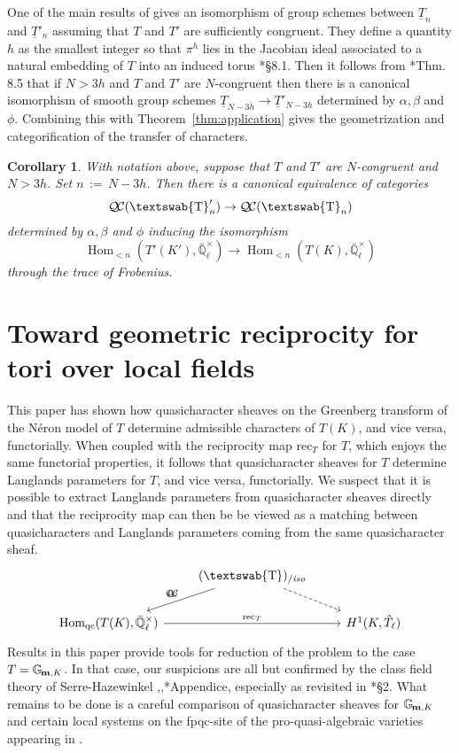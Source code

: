 \documentclass[11pt]{amsart}
\DeclareRobustCommand{\VAN}[3]{#2}
\newcommand{\mathswab}[1]{\operatorname{\textswab{#1}}}
\theoremstyle{plain}
\newtheorem{corollary}[theorem]{Corollary}
\theoremstyle{definition}
\theoremstyle{remark}
\newcommand{\EE}{\mathbb{\bar Q}_\ell}
\newcommand{\EEx}{\EE^\times}
\DeclareMathOperator{\Hom}{Hom}
\newcommand{\ceq}{{\, :=\, }}
\newcommand{\Gm}[1]{\mathbb{G}_{\hskip-1pt\textbf{m},#1}}
\newcommand{\GN}[1]{\mathswab{#1}}
\newcommand{\TT}{\underline{T}}
\newcommand{\QC}{{\mathcal{Q\hskip-0.8pt C}}}
\newcommand{\QCiso}[1]{\QC(#1)_{/\textit{iso}}}
\newcommand{\trFrob}[1]{t_{#1}}
\begin{document}
One of the main results of \cite{chai-yu:01a} gives an isomorphism of group schemes between
$\TT_n$ and $\TT'_n$ assuming that $T$ and $T'$ are sufficiently congruent.
They define a quantity $h$ as the smallest integer so that $\pi^h$ lies in the
Jacobian ideal associated to a natural embedding of $T$ into an induced torus \cite{chai-yu:01a}*{\S 8.1}.
Then it follows from \cite{chai-yu:01a}*{Thm. 8.5} that if $N > 3h$ and $T$ and $T'$ are $N$-congruent 
then there is a canonical isomorphism of smooth group schemes
 $
  \TT_{N-3h} \to \TT'_{N-3h}
 $
 determined by $\alpha, \beta$ and $\phi$.
Combining this with Theorem~\ref{thm:application} gives the geometrization and categorification of the transfer of characters.

\begin{corollary}\label{cor:transfer}
 With notation above, suppose that $T$ and $T'$ are $N$-congruent and $N > 3h$.  Set $n \ceq N-3h$.
 Then there is a canonical equivalence of categories
 \[
  \QC(\GN{T}'_{n}) \to \QC(\GN{T}_{n})
 \]
 determined by $\alpha, \beta$ and $\phi$ inducing the isomorphism
 \[
  \Hom_{<n}(T'(K'), \EEx) \to \Hom_{<n}(T(K), \EEx)
 \]
 through the trace of Frobenius.
\end{corollary}


\section{Toward geometric reciprocity for tori over local fields}
\label{sec:reciprocity}

This paper has shown how quasicharacter sheaves 
on the Greenberg transform of the Néron model of $T$ 
determine admissible characters of $T(K)$, and vice versa, functorially.
When coupled with the reciprocity map $\text{rec}_T $ for $T$, 
which enjoys the same functorial properties, 
it follows that quasicharacter sheaves for $T$ 
determine Langlands parameters for $T$, and vice versa, functorially.
We suspect that it is possible to extract Langlands parameters 
from quasicharacter sheaves directly and that the reciprocity map 
can then be be viewed as a matching between quasicharacters and Langlands parameters coming
 from the same quasicharacter sheaf. 
 \[
\begin{tikzcd}
\ & \arrow[swap]{dl}{\trFrob{G}} \QCiso{\GN{T}} \arrow[dashed]{dr} & \\
\Hom_{\text{qc}}(T(K),\EEx) \arrow{rr}{\text{rec}_T} && H^1(K,\hat{T}_\ell)
\end{tikzcd}
\]
 Results in this paper provide tools for reduction of the problem to the case $T=\Gm{K}$. 
 In that case, our suspicions are all but confirmed 
 by the class field theory of Serre-Hazewinkel
 \cite{serre:60a},\cite{serre:61a},\cite{demazure-gabriel:GroupesAlgebriques}*{Appendice},
 especially as revisited in \cite{suzuki-yoshida:12a}*{\S 2}. 
 What remains to be done is a careful comparison of 
 quasicharacter sheaves for $\Gm{K}$ and certain local systems on
  the fpqc-site of the pro-quasi-algebraic varieties appearing in \cite{suzuki-yoshida:12a}. 


\DeclareRobustCommand{\VAN}[3]{#3}

\end{document}
